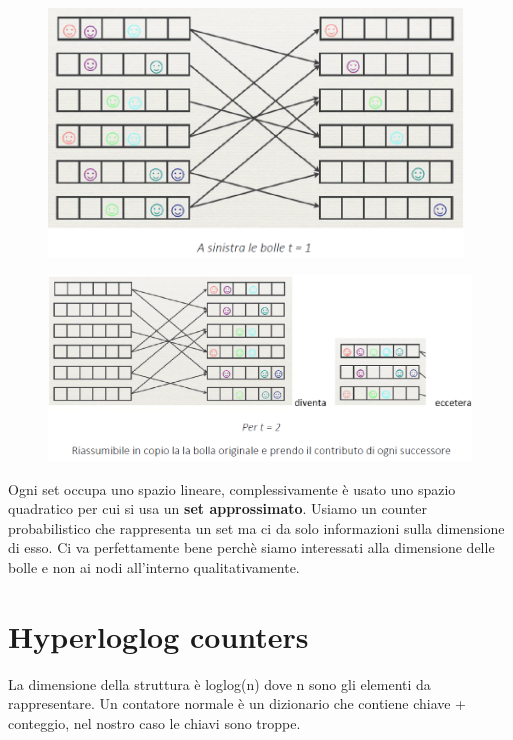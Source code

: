 \documentclass[12pt,italian]{report}
\begin{document}
\begin{figure}[h]
	\centering
	\includegraphics[width=110mm]{image/hyperball3.png}
	\label{fig:hyperball3}
\end{figure}
\clearpage
\begin{figure}[h]
	\centering
	\includegraphics[width=140mm]{image/hyperball4.png}
	\label{fig:hyperball4}
\end{figure}

Ogni set occupa uno spazio lineare, complessivamente è usato uno spazio quadratico per cui si usa un \textbf{set approssimato}. Usiamo un counter probabilistico che rappresenta un set ma ci da solo informazioni sulla dimensione di esso. Ci va perfettamente bene perchè siamo interessati alla dimensione delle bolle e non ai nodi all'interno qualitativamente. 

\section{Hyperloglog counters}
\label{hyperlog}
La dimensione della struttura è loglog(n) dove n sono gli elementi da rappresentare. Un contatore normale è un dizionario che contiene chiave + conteggio, nel nostro caso le chiavi sono troppe. 
\end{document}
